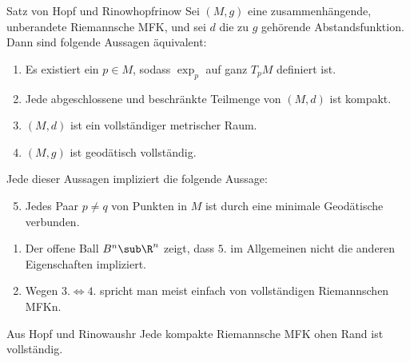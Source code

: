 \begin{theorem}{Satz von Hopf und Rinow}{hopfrinow}
Sei $(M,g)$ eine zusammenhängende, unberandete Riemannsche MFK, und sei $d$ die zu $g$ gehörende Abstandsfunktion. Dann sind folgende Aussagen äquivalent:
\begin{enumerate}
\item Es existiert ein $p \in M$, sodass $\exp_p$ auf ganz $T_pM$ definiert ist.
\item Jede abgeschlossene und beschränkte Teilmenge von $(M,d)$ ist kompakt.
\item $(M,d)$ ist ein vollständiger metrischer Raum.
\item $(M,g)$ ist geodätisch vollständig.
\end{enumerate}
Jede dieser Aussagen impliziert die folgende Aussage:\\
\begin{enumerate}
\setcounter{enumi}{4}
\item Jedes Paar $p \neq q$ von Punkten in $M$ ist durch eine minimale Geodätische verbunden.
\end{enumerate}
\end{theorem}
\begin{bemerkungen}
\begin{enumerate}
\item Der offene Ball $B^n \sub \R^n$ zeigt, dass $5.$ im Allgemeinen nicht die anderen Eigenschaften impliziert.
\item Wegen $3. \iff 4.$ spricht man meist einfach von vollständigen Riemannschen MFKn.
\end{enumerate}
\end{bemerkungen}
\begin{korollar}{Aus Hopf und Rinow}{aushr}
Jede kompakte Riemannsche MFK ohen Rand ist vollständig.
\end{korollar}
